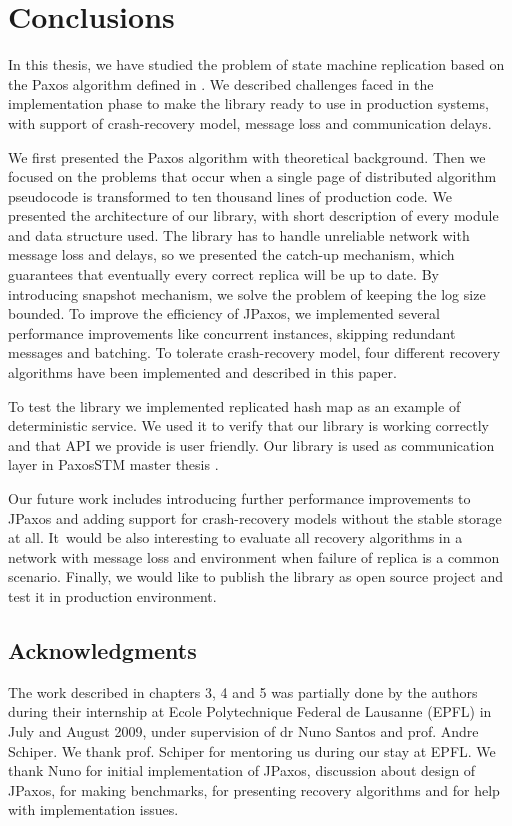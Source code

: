 \chapter{Conclusions}

In this thesis, we have studied the problem of state machine replication based
on the Paxos algorithm defined in \cite{Lam98}. We described challenges faced in
the implementation phase to make the library ready to use in production systems,
with support of crash-recovery model, message loss and communication delays.

We first presented the Paxos algorithm with theoretical background. Then we
focused on the problems that occur when a single page of distributed algorithm
pseudocode is transformed to ten thousand lines of production code. We
presented the architecture of our library, with short description of every
module and data structure used. The library has to handle unreliable network
with message loss and delays, so we presented the catch-up mechanism, which
guarantees that eventually every correct replica will be up to date. By
introducing snapshot mechanism, we solve the problem of keeping the log size
bounded. To improve the efficiency of JPaxos, we implemented several
performance improvements like concurrent instances, skipping redundant messages
and batching. To tolerate crash-recovery model, four different recovery
algorithms have been implemented and described in this paper.

To test the library we implemented replicated hash map as an example of
deterministic service. We used it to verify that our library is working
correctly and that API we provide is user friendly. Our library is used as 
communication layer in PaxosSTM master thesis \cite{Tad10}.

Our future work includes introducing further performance improvements to JPaxos
and adding support for crash-recovery models without the stable storage at all.
It~would be also interesting to evaluate all recovery algorithms in a network
with message loss and environment when failure of replica is a common scenario.
Finally, we would like to publish the library as open source project and test
it in production environment.

\section*{Acknowledgments}

The work described in chapters 3, 4 and 5 was partially done by the authors during
their internship at Ecole Polytechnique Federal de Lausanne (EPFL) in July and
August 2009, under supervision of dr Nuno Santos and prof. Andre Schiper. We
thank prof. Schiper for mentoring us during our stay at EPFL. We thank Nuno for
initial implementation of JPaxos, discussion about design of JPaxos, for making
benchmarks, for presenting recovery algorithms and for help with implementation
issues. 

